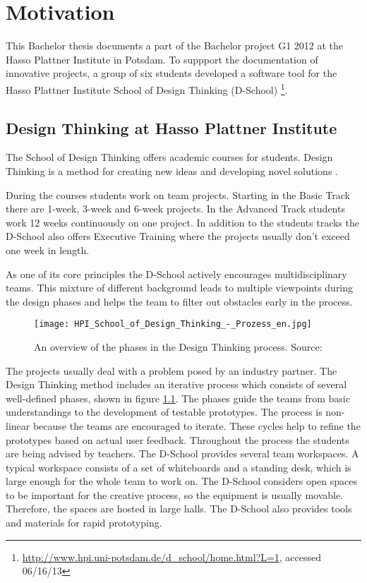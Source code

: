 \chapter{Motivation}

This Bachelor thesis documents a part of the Bachelor project G1 2012 at the Hasso Plattner Institute in Potsdam. To suppport the documentation of innovative projects, a group of six students developed a software tool for the Hasso Plattner Institute School of Design Thinking (D-School) \footnote{\url{http://www.hpi.uni-potsdam.de/d_school/home.html?L=1}, accessed 06/16/13}. 

\section{Design Thinking at Hasso Plattner Institute}
The School of Design Thinking offers academic courses for students. Design Thinking is a method for creating new ideas and developing novel solutions \cite{Plattner_2009}. 

During the courses students work on team projects. Starting in the Basic Track there are 1-week, 3-week and 6-week projects. In the Advanced Track students work 12 weeks continuously on one project. In addition to the students tracks the D-School also offers Executive Training where the projects usually don't exceed one week in length. 

As one of its core principles the D-School actively encourages multidisciplinary teams. This mixture of different background leads to multiple viewpoints during the design phases and helps the team to filter out obstacles early in the process. 

\begin{figure}[!h]
\texttt{[image: HPI\_School\_of\_Design\_Thinking\_-\_Prozess\_en.jpg]}
\caption{An overview of the phases in the Design Thinking process. Source: \cite{Plattner_2009}}
\label{fig:DT_phases}
\end{figure}

The projects usually deal with a problem posed by an industry partner. The Design Thinking method includes an iterative process which consists of several well-defined phases, shown in figure \ref{fig:DT_phases}. The phases guide the teams from basic understandings to the development of testable prototypes. The process is non-linear because the teams are encouraged to iterate. These cycles help to refine the prototypes based on actual user feedback. Throughout the process the students are being advised by teachers.
The D-School provides several team workspaces. A typical workspace consists of a set of whiteboards and a standing desk, which is large enough for the whole team to work on. The D-School considers open spaces to be important for the creative process, so the equipment is usually movable. Therefore, the spaces are hosted in large halls. The D-School also provides tools and materials for rapid prototyping.

